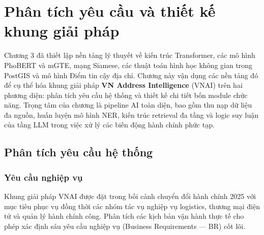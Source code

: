 
\chapter{Phân tích yêu cầu và thiết kế khung giải pháp}
\label{ch:thiet-ke}
\label{ch:design} %

Chương 3 đã thiết lập nền tảng lý thuyết về kiến trúc Transformer, các mô hình PhoBERT và mGTE, mạng Siamese, các thuật toán hình học không gian trong PostGIS và mô hình Điểm tin cậy địa chỉ. Chương này vận dụng các nền tảng đó để cụ thể hóa khung giải pháp \textbf{VN Address Intelligence} (VNAI) trên hai phương diện: phân tích yêu cầu hệ thống và thiết kế chi tiết bốn module chức năng. Trọng tâm của chương là pipeline AI toàn diện, bao gồm thu nạp dữ liệu đa nguồn, huấn luyện mô hình NER, kiến trúc retrieval đa tầng và logic suy luận của tầng LLM trong việc xử lý các biến động hành chính phức tạp.

\section{Phân tích yêu cầu hệ thống}
\label{sec:yeu-cau}

\subsection{Yêu cầu nghiệp vụ}
\label{sec:business-req}

Khung giải pháp VNAI được đặt trong bối cảnh chuyển đổi hành chính 2025 với mục tiêu phục vụ đồng thời các nhóm tác vụ nghiệp vụ logistics, thương mại điện tử và quản lý hành chính công. Phân tích các kịch bản vận hành thực tế cho phép xác định sáu yêu cầu nghiệp vụ (Business Requirements --- BR) cốt lõi.

